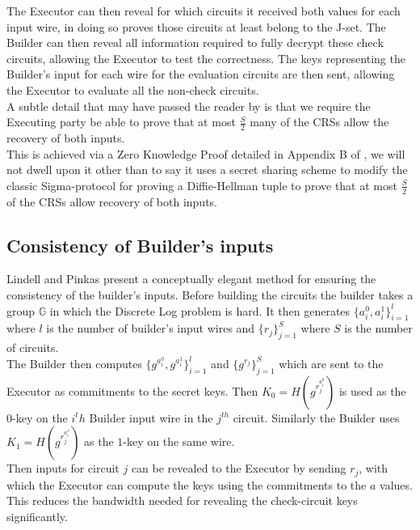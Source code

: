\documentclass[ %
                    author={Nicholas Tutte},
                supervisor={Prof. Nigel Smart},
                    degree={MEng},
                     title={Secure Two Party Computation},
                  subtitle={A practical comparison of recent protocols},
                      type={Research - GG1K},
                      year={2015} ]{dissertation}
\begin{document}
				The Executor can then reveal for which circuits it received both values for each input wire, in doing so proves those circuits at least belong to the J-set. The Builder can then reveal all information required to fully decrypt these check circuits, allowing the Executor to test the correctness. The keys representing the Builder's input for each wire for the evaluation circuits are then sent, allowing the Executor to evaluate all the non-check circuits.\\

				A subtle detail that may have passed the reader by is that we require the Executing party be able to prove that at most $\frac{S}{2}$ many of the CRSs allow the recovery of both inputs.\\ 

				This is achieved via a Zero Knowledge Proof detailed in Appendix B of \cite{LindellAndPinkas2011}, we will not dwell upon it other than to say it uses a secret sharing scheme to modify the classic Sigma-protocol for proving a Diffie-Hellman tuple to prove that at most $\frac{S}{2}$ of the CRSs allow recovery of both inputs.

			\subsection{Consistency of Builder's inputs}
				Lindell and Pinkas present a conceptually elegant method for ensuring the consistency of the builder's inputs. Before building the circuits the builder takes a group $\mathbb{G}$ in which the Discrete Log problem is hard. It then generates $\{a_i^0, a_i^1\}_{i = 1}^{l}$ where $l$ is the number of builder's input wires and $\{r_j\}_{j = 1}^{S}$ where $S$ is the number of circuits.\\

				The Builder then computes $\{g^{a_i^0}, g^{a_i^1}\}_{i = 1}^{l}$ and $\{g^{r_j}\}_{j = 1}^{S}$ which are sent to the Executor as commitments to the secret keys. Then $K_0 = H(g^{r_j^{a_i^0}})$ is used as the $0$-key on the $i^th$ Builder input wire in the $j^{th}$ circuit. Similarly the Builder uses $K_1 = H(g^{r_j^{a_i^1}})$ as the $1$-key on the same wire.\\

				Then inputs for circuit $j$ can be revealed to the Executor by sending $r_j$, with which the Executor can compute the keys using the commitments to the $a$ values. This reduces the bandwidth needed for revealing the check-circuit keys significantly.\\
\end{document}
